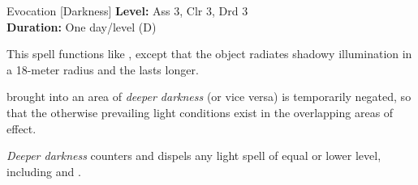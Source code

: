{Evocation [Darkness]}
{
	\textbf{Level:}
	Ass 3, Clr 3, Drd 3\\
	\textbf{Duration:}
	One day/level (D)\\
}
{
	This spell functions like , except that the object radiates shadowy illumination in a 18-meter radius and the  lasts longer.

	 brought into an area of \emph{deeper darkness} (or vice versa) is temporarily negated, so that the otherwise prevailing light conditions exist in the overlapping areas of effect.

	\emph{Deeper darkness} counters and dispels any light spell of equal or lower level, including  and .

}
